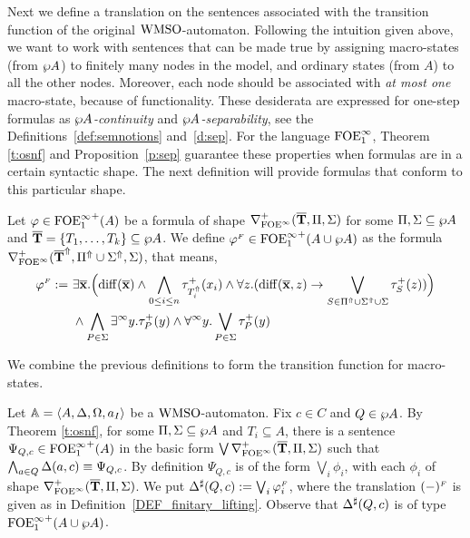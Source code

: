 Next we define a translation on the sentences associated with the transition
function of the original $\mathrm{WMSO}$-automaton.
Following the intuition given above, we want to work with sentences that can be
made true by assigning macro-states (from $\wp A$) to finitely many nodes in the
model, and ordinary states (from $A$) to all the other nodes.
Moreover, each node should be associated with \emph{at most one} macro-state,
because of functionality. 
These desiderata are expressed for one-step formulas as \emph{$\wp A$-continuity} 
and \emph{$\wp A$-separability}, see the Definitions~\ref{def:semnotions} 
and~\ref{d:sep}.
For the language $\mathrm{FOE}^{\infty}_1$, Theorem \ref{t:osnf} and Proposition~\ref{p:sep}
guarantee these properties when formulas are in a certain syntactic shape.
The next definition will provide formulas that conform to this particular shape.

\begin{definition}\label{DEF_finitary_lifting}
Let $\varphi \in {\ensuremath{\mathrm{FOE}^{\infty}_1}}^+(A)$ be a formula of shape 
$\nabla^+_{\mathrm{FOE}^{\infty}}(\overline{{\mathbf{T}}},\Pi,\Sigma)$ for some $\Pi,\Sigma \subseteq \wp A$ 
and $\overline{{\mathbf{T}}} = \{T_1,\dots,T_k\} \subseteq \wp A$. 
We define $\varphi^{{\scriptscriptstyle F}} \in {\ensuremath{\mathrm{FOE}^{\infty}_1}}^+(A \cup \wp A)$ as the formula
$\nabla^+_{\mathrm{FOE}^{\infty}}(\overline{{\mathbf{T}}}^{\Uparrow},\Pi^{\Uparrow} \cup \Sigma^{\Uparrow},\Sigma)$, that
means,
\begin{equation}\label{eq:unfoldingNablaolque}
\begin{aligned}
\phi^{\fin} \df\ &
    \exists \vlist{x}.\Big(\arediff{\vlist{x}}
      \land \bigwedge_{0 \leq i \leq n} \tau^+_{\lift{T}_i}(x_i)
\land
    \forall z.(\arediff{\vlist{x},z} \to
    \bigvee_{S\in \lift{\Pi} \cup \lift{\Sigma} \cup \Sigma}
       \tau^+_S(z))\Big)
\\ &
    \land \bigwedge_{P\in\Sigma} \qu y.{\tau}^{+}_P(y)
 \land
    \dqu y.\bigvee_{P\in\Sigma} {\tau}^{+}_P(y)
    \end{aligned}
\end{equation}
\end{definition}


We combine the previous definitions to form the transition function for
macro-states.

\begin{definition}\label{PROP_DeltaPowerset}
Let $\mathbb{A} = \langle{A,\Delta,\Omega,a_I}\rangle$ be a $\mathrm{WMSO}$-automaton. 
Fix $c \in C$ and $Q \in \wp A$. 
By Theorem \ref{t:osnf}, for some $\Pi,\Sigma \subseteq
\wp A$ and $T_i \subseteq A$, there is a sentence $\Psi_{Q,c} \in {\ensuremath{\mathrm{FOE}^{\infty}_1}}^+(A)$
in the basic form $\bigvee \nabla^+_{\mathrm{FOE}^{\infty}}(\overline{{\mathbf{T}}},\Pi,\Sigma)$ such that
$\bigwedge_{a \in Q} \Delta(a,c) \equiv \Psi_{Q,c}$. 
By definition $\Psi_{Q,c}$ is of the form $\bigvee_{i}\phi_i$, with each
$\phi_{i}$ of shape $\nabla^+_{\mathrm{FOE}^{\infty}}(\overline{{\mathbf{T}}},\Pi,\Sigma)$. 
We put $\Delta^{\sharp}(Q,c) \mathrel{:=} \bigvee_{i}\varphi_i^{{\scriptscriptstyle F}}$, where the translation
$(-)^{{\scriptscriptstyle F}}$ is given as in Definition~\ref{DEF_finitary_lifting}. 
Observe that $\Delta^{\sharp}(Q,c)$ is of type ${\mathrm{FOE}^{\infty}_1}^+(A \cup \wp A)$.
\end{definition}

